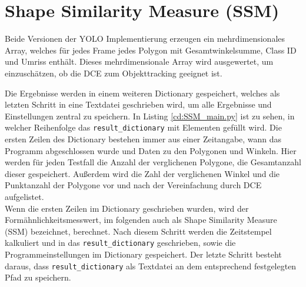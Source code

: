 {	

	
	

	
	
}


\section{Shape Similarity Measure (SSM)}{
	\label{py:Shape_Sim_Meas}
	Beide Versionen der YOLO Implementierung erzeugen ein mehrdimensionales Array, welches für jedes Frame jedes Polygon mit Gesamtwinkelsumme, Class ID und Umriss enthält. Dieses mehrdimensionale Array wird ausgewertet, um einzuschätzen, ob die DCE zum Objekttracking geeignet ist. 

	Die Ergebnisse werden in einem weiteren Dictionary gespeichert, welches als letzten Schritt in eine Textdatei geschrieben wird, um alle Ergebnisse und Einstellungen zentral zu speichern. In Listing \ref{cd:SSM_main.py} ist zu sehen, in welcher Reihenfolge das \lstinline|result_dictionary| mit Elementen gefüllt wird. Die ersten Zeilen des Dictionary bestehen immer aus einer Zeitangabe, wann das Programm abgeschlossen wurde und Daten zu den Polygonen und Winkeln. Hier werden für jeden Testfall die Anzahl der verglichenen Polygone, die Gesamtanzahl dieser gespeichert. Außerdem wird die Zahl der verglichenen Winkel und die Punktanzahl der Polygone vor und nach der Vereinfachung durch DCE aufgelistet. \\
	Wenn die ersten Zeilen im Dictionary geschrieben wurden, wird der Formähnlichkeitsmesswert, im folgenden auch als \glqq Shape Similarity Measure\grqq{} (SSM) bezeichnet, berechnet. Nach diesem Schritt werden die Zeitstempel kalkuliert und in das \lstinline|result_dictionary| geschrieben, sowie die Programmeinstellungen im Dictionary gespeichert. Der letzte Schritt besteht daraus, dass \lstinline|result_dictionary| als Textdatei an dem entsprechend festgelegten Pfad zu speichern.

}
